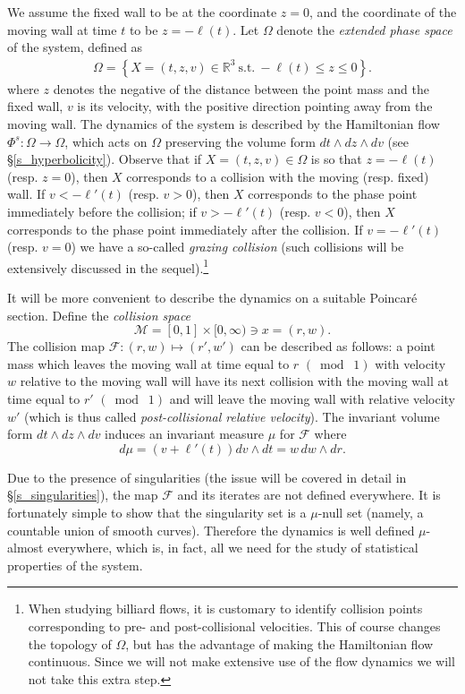 \documentclass[10pt]{amsart}
\theoremstyle{definition}\newtheorem{defi}[theo]{Definition}\newtheorem{rema}[theo]{Remark}\newtheorem{exam}[theo]{Example}\newtheorem{exem}[theo]{Example}\newtheorem{nota}[theo]{Notation}
\newcommand{\ct}{r}
\newcommand{\deh}{\mathrm{d}}
\newcommand{\st}{\ \text{s.t.}\ }
\newcommand{\bR}{\mathbb{R}}
\newcommand{\cm}{\mathcal{F}}
\newcommand{\csp}{\mathcal{M}}
\newcommand{\exph}{\Omega}
\newcommand{\flow}[1]{\Phi^{#1}}
\renewcommand{\deh}{d}
\begin{document}
We assume the fixed wall to be at the coordinate $z = 0$, and the coordinate of the moving wall at time $t$ to be $z = -\ell(t)$. Let $\exph$ denote the \emph{extended phase space} of the system, defined as
\begin{align*}
\exph=\left\{X=(t,z,v)\in\bR^3\st -\ell(t)\leq z\leq 0\right\}.
\end{align*}
where $z$ denotes the negative of the distance between the point mass and the fixed wall, $v$ is its velocity, with the positive direction pointing away from the moving wall. The dynamics of the system is described by the Hamiltonian flow $\flow{s}:\exph\to\exph$, which acts on $\exph$ preserving the volume form $\deh t\wedge \deh z \wedge \deh v$ (see \S\ref{s_hyperbolicity}). Observe that if $X = (t,z,v)\in\exph$ is so that $z = -\ell(t)$ (resp. $z = 0$), then $X$ corresponds to a collision with the moving (resp. fixed) wall. If $v < -\ell'(t)$ (resp. $v > 0$), then $X$ corresponds to the phase point immediately before the collision; if $v > -\ell'(t)$ (resp. $v < 0$), then $X$ corresponds to the phase point immediately after the collision. If $v = -\ell'(t)$ (resp. $v = 0$) we have a so-called \emph{grazing collision} (such collisions will be extensively discussed in the sequel).\footnote{\label{fn:discontinuous-flow}
When studying billiard flows, it is customary to identify collision points corresponding to pre- and post-collisional velocities. This of course changes the topology of $\exph$, but has the advantage of making the Hamiltonian flow continuous. Since we will not make extensive use of the flow dynamics we will not take this extra step.}

It will be more convenient to describe the dynamics on a suitable Poincaré section. Define the \emph{collision space}
\[
\csp=[0,1]\times[0,\infty) \ni x =(\ct,w).
\]
The collision map
$\cm:(\ct,w)\mapsto(\ct',w')$ can be described as follows: a point mass which leaves the moving wall at time equal to $\ct$ $(\bmod\; 1)$ with velocity $w$ relative to the moving wall will have its next collision with the moving wall at time equal to $\ct'$ $(\bmod\; 1)$ and will leave the moving wall with relative velocity $w'$ (which is thus called \emph{post-collisional relative velocity}). The invariant volume form $\deh t\wedge \deh z \wedge \deh v$ induces an invariant
measure $\mu$ for $\cm$ where
\[
d\mu=(v+\ell'(t)) dv\wedge dt =
w\,dw\wedge dr.
\]

Due to the presence of singularities (the issue will be covered in detail in \S\ref{s_singularities}), the map $\cm$ and its iterates are not defined everywhere. It is fortunately simple to show that the singularity set is a $\mu$-null set (namely, a countable union of smooth curves). Therefore the dynamics is well defined $\mu$-almost everywhere, which is, in fact, all we need for the study of statistical properties of the system.
\end{document}

